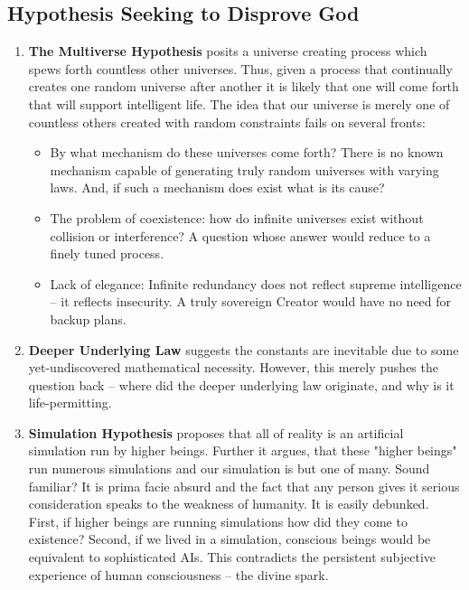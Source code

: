 \documentclass[12pt,a4paper]{book}
\begin{document}
\subsection{Hypothesis Seeking to Disprove God}
\begin{enumerate}

\item \textbf{The Multiverse Hypothesis} posits a universe creating process which spews forth countless other universes.  Thus, given a process that continually creates one random universe after another it is likely that one will come forth that will support intelligent life.  The idea that our universe is merely one of countless others created with random constraints fails on several fronts:

\begin{itemize}
\item By what mechanism do these universes come forth?  There is no known mechanism capable of generating truly random universes with varying laws.  And, if such a mechanism does exist what is its cause?
\item The problem of coexistence: how do infinite universes exist without collision or interference?  A question whose answer would reduce to a finely tuned process.
\item Lack of elegance: Infinite redundancy does not reflect supreme intelligence -- it reflects insecurity.  A truly sovereign Creator would have no need for backup plans.
\end{itemize}

\item \textbf{Deeper Underlying Law} suggests the constants are inevitable due to some yet-undiscovered mathematical necessity.  However, this merely pushes the question back -- where did the deeper underlying law originate, and why is it life-permitting.

\item \textbf{Simulation Hypothesis} proposes that all of reality is an artificial simulation run by higher beings.   Further it argues, that these "higher beings" run numerous simulations and our simulation is but one of many.  Sound familiar?  It is prima facie absurd and the fact that any person gives it serious consideration speaks to the weakness of humanity.   It is easily debunked.  First, if higher beings are running simulations how did they come to existence?  Second, if we lived in a simulation, conscious beings would be equivalent to sophisticated AIs.  This contradicts the persistent subjective experience of human consciousness -- the divine spark. 

\end{enumerate}
\end{document}
